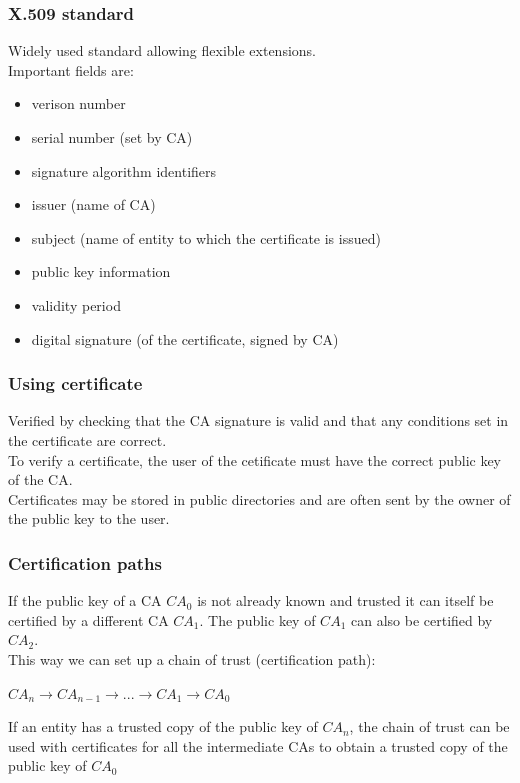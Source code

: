 \documentclass{article}
\begin{document}
\subsubsection{X.509 standard}

Widely used standard allowing flexible extensions.\\
Important fields are:
\begin{itemize}
    \item verison number
    \item serial number (set by CA)
    \item signature algorithm identifiers
    \item issuer (name of CA)
    \item subject (name of entity to which the certificate is issued)
    \item public key information
    \item validity period
    \item digital signature (of the certificate, signed by CA)
\end{itemize}

\subsubsection{Using certificate}

Verified by checking that the CA signature is valid and that any conditions set in the certificate are correct.\\
To verify a certificate, the user of the cetificate must have the correct public key of the CA.\\
Certificates may be stored in public directories and are often sent by the owner of the public key to the user.

\subsubsection{Certification paths}

If the public key of a CA $CA_0$ is not already known and trusted it can itself be certified by a different CA $CA_1$. The public key of $CA_1$ can also be certified by $CA_2$.\\
This way we can set up a chain of trust (certification path):\\
\begin{center}
    $CA_n \rightarrow CA_{n-1} \rightarrow ... \rightarrow CA_1 \rightarrow CA_0$
\end{center}
If an entity has a trusted copy of the public key of $CA_n$, the chain of trust can be used with certificates for all the intermediate CAs to obtain a trusted copy of the public key of $CA_0$
\end{document}

